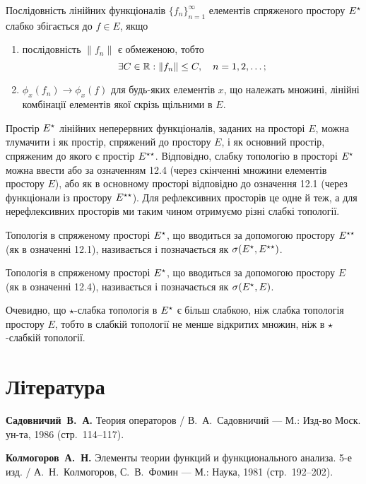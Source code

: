 \begin{theorem}
Послідовність лінійних функціоналів $\{f_n\}_{n = 1}^\infty$
елементів спряженого простору $E^\star$ слабко збігається до
$f \in E$, якщо
\begin{enumerate}
\item послідовність $\|f_n\|$ є обмеженою, тобто
\begin{equation*}
\exists C \in \mathbb{R}: \|f_n\| \le C, \quad n = 1, 2, \dots;
\end{equation*}
\item $\phi_x(f_n) \to \phi_x(f)$ для будь-яких елементів $x$, що
належать множині, лінійні комбінації елементів якої скрізь
щільними в $E$.
\end{enumerate}
\end{theorem}

\begin{remark}
Простір $E^\star$ лінійних неперервних функціоналів, заданих
на просторі $E$, можна тлумачити і як простір, спряжений до
простору $E$, і як основний простір, спряженим до якого є
простір $E^{\star\star}$. Відповідно, слабку топологію в просторі $E^\star$
можна ввести або за означенням 12.4 (через скінченні
множини елементів простору $E$), або як в основному
просторі відповідно до означення 12.1 (через функціонали із
простору $E^{\star\star}$). Для рефлексивних просторів це одне й теж, а
для нерефлексивних просторів ми таким чином отримуємо
різні слабкі топології.
\end{remark}

\begin{definition}
Топологія в спряженому просторі $E^\star$, що
вводиться за допомогою простору $E^{\star\star}$ (як в означенні 12.1),
називається  і позначається як $\sigma(E^\star, E^{\star\star})$.
\end{definition}

\begin{definition}
Топологія в спряженому просторі $E^\star$, що
вводиться за допомогою простору $E$ (як в означенні 12.4),
називається  і позначається як $\sigma(E^\star, E)$.
\end{definition}

\begin{remark}
Очевидно, що $\star$-слабка топологія в $E^\star$ є
більш слабкою, ніж слабка топологія простору $E$, тобто в
слабкій топології не менше відкритих множин, ніж в
$\star$-слабкій топології.
\end{remark}

\section{Література}

\begin{enumerate}[label={[\arabic*]}]
\item \textbf{Садовничий~В.~А.}
Теория операторов /
В.~А.~Садовничий ---
М.: Изд-во Моск. ун-та, 1986 (стр.~114--117).
\item \textbf{Колмогоров~А.~Н.}
Элементы теории функций и функционального анализа. 5-е изд. /
А.~Н.~Колмогоров, С.~В.~Фомин ---
М.: Наука, 1981 (стр.~192--202).
\end{enumerate}
